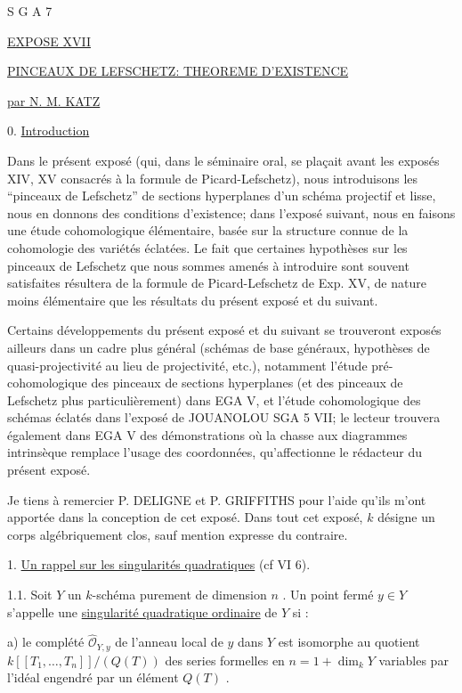 


S G A 7


\underline{EXPOSE XVII}


\underline{PINCEAUX DE LEFSCHETZ: THEOREME D'EXISTENCE}


\underline{par N. M. KATZ}


0. \underline{Introduction}

Dans le présent exposé (qui, dans le séminaire oral, se plaçait avant les exposés XIV, XV consacrés à la formule de Picard-Lefschetz), nous introduisons les ``pinceaux de Lefschetz'' de sections hyperplanes d'un schéma projectif et lisse, nous en donnons des conditions d'existence; dans l'exposé suivant, nous en faisons une étude cohomologique élémentaire, basée sur la structure connue de la cohomologie des variétés éclatées. Le fait que certaines hypothèses sur les pinceaux de Lefschetz que nous sommes amenés à introduire sont souvent satisfaites résultera de la formule de Picard-Lefschetz de Exp. XV, de nature moins élémentaire que les résultats du présent exposé et du suivant.

Certains développements du présent exposé et du suivant se trouveront exposés ailleurs dans un cadre plus général (schémas de base généraux, hypothèses de quasi-projectivité au lieu de projectivité, etc.), notamment l'étude pré-cohomologique des pinceaux de sections hyperplanes (et des pinceaux de Lefschetz plus particulièrement) dans EGA V, et l'étude cohomologique des schémas éclatés dans
l'exposé de JOUANOLOU SGA 5 VII; le lecteur trouvera également dans EGA V des démonstrations où la chasse aux diagrammes intrinsèque remplace l'usage des coordonnées, qu'affectionne le rédacteur du présent exposé.

Je tiens à remercier P. DELIGNE et P. GRIFFITHS pour l'aide qu'ils m'ont apportée dans la conception de cet exposé. Dans tout cet exposé, $k$ désigne un corps algébriquement clos, sauf mention expresse du contraire.


1. \underline{Un rappel sur les singularités quadratiques} (cf VI 6).

1.1. \quad Soit $Y$ un $k$-schéma purement de dimension $n$ . Un point fermé $y \in Y$ s'appelle une \underline{singularité quadratique ordinaire} de $Y$ si :

\begin{sloppypar}
a) le complété $\hat{\mathcal{O}}_{Y,y}$ de l'anneau local de $y$ dans $Y$ est isomorphe au quotient $k[[T_1,\ldots,T_n]]/(Q(T))$ des series formelles en $n=1+\dim_k Y$ variables par l'idéal engendré par un élément $Q(T)$ .
\end{sloppypar}

